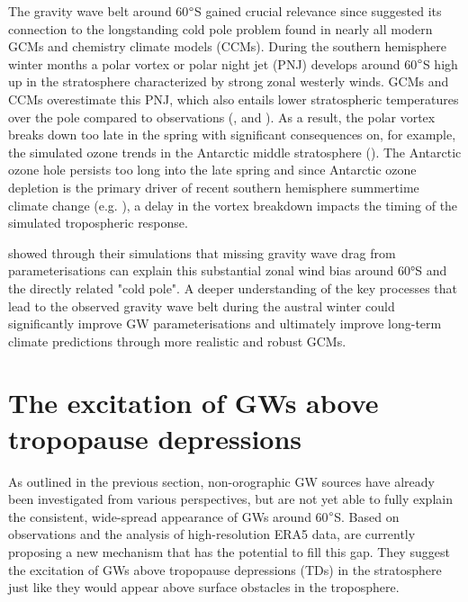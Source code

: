 The gravity wave belt around 60$\degree$S gained crucial relevance since \textcite{mclandress_is_2012} suggested its connection to the longstanding cold pole problem found in nearly all modern GCMs and chemistry climate models (CCMs). During the southern hemisphere winter months a polar vortex or polar night jet (PNJ) develops around 60$\degree$S high up in the stratosphere characterized by strong zonal westerly winds. GCMs and CCMs overestimate this PNJ, which also entails lower stratospheric temperatures over the pole compared to observations (\cite{butchart_multimodel_2011}, \cite{geller_comparison_2013} and \cite{eyring_sparc_2010}). As a result, the polar vortex breaks down too late in the spring with significant consequences on, for example, the simulated ozone trends in the Antarctic middle stratosphere (\cite{stolarski_ozone_2006}). The Antarctic ozone hole persists too long into the late spring and since Antarctic ozone depletion is the primary driver of recent southern hemisphere summertime climate change (e.g. \cite{arblaster_contributions_2006}), a delay in the vortex breakdown impacts the timing of the simulated tropospheric response.

\textcite{mclandress_is_2012} showed through their simulations that missing gravity wave drag from parameterisations can explain this substantial zonal wind bias around 60°S and the directly related "cold pole". A deeper understanding of the key processes that lead to the observed gravity wave belt during the austral winter could significantly improve GW parameterisations and ultimately improve long-term climate predictions through more realistic and robust GCMs. 







\section{The excitation of GWs above tropopause depressions}
\label{sec:excitation}

As outlined in the previous section, non-orographic GW sources have already been investigated from various perspectives, but are not yet able to fully explain the consistent, wide-spread appearance of GWs around 60$\degree$S. Based on observations and the analysis of high-resolution ERA5 data, \textcite{dornbrack_stratospheric_2022} are currently proposing a new mechanism that has the potential to fill this gap. They suggest the excitation of GWs above tropopause depressions (TDs) in the stratosphere just like they would appear above surface obstacles in the troposphere. 

